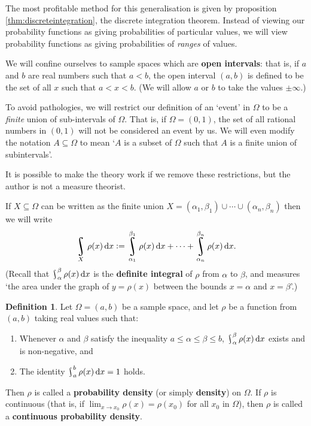\documentclass[a4paper,leqno]{article}
\DeclareMathOperator*{\rint}{\scalerel*{\rotatebox{17}{$\!\int\!$}}{\int}}
\numberwithin{equation}{section}
\theoremstyle{definition}
\newtheorem{defn}[equation]{Definition}
\theoremstyle{remark}
\newcommand{\df}{\textbf}
\newcommand{\union}{\cup}
\begin{document}
The most profitable method for this generalisation is given by proposition \ref{thm:discreteintegration}, the
discrete integration theorem. Instead of viewing our probability functions as giving probabilities of particular
values, we will view probability functions as giving probabilities of \emph{ranges} of values.

We will confine ourselves to sample spaces which are \df{open intervals}: that is, if $ a $ and $ b $ are real numbers
such that $ a < b $, the open interval $ (a,b) $ is defined to be the set of all $ x $ such that $ a < x < b $. (We will
allow $ a $ or $ b $ to take the values $ \pm \infty $.)

To avoid pathologies, we will restrict our definition of an `event' in $ \Omega $ to be a \emph{finite} union of sub-intervals of $ \Omega $.
That is, if $ \Omega = (0,1) $, the set of all rational numbers in $ (0,1) $ will not be considered an event by us. We will even modify the notation
$ A \subseteq \Omega $ to mean `$ A $ is a subset of $ \Omega $ such that $ A $ is a finite union of subintervals'.

It is possible to make the theory work if we remove these restrictions, but the author is not a measure theorist.

If $ X \subseteq \Omega $ can be written as the finite union $ X = (\alpha_1,\beta_1) \union \cdots \union (\alpha_n, \beta_n) $ then
we will write
\begin{displaymath}
  \rint_X \rho(x) \dif{x} := \rint_{\alpha_1}^{\beta_1} \rho(x) \dif{x} + \cdots + \rint_{\alpha_n}^{\beta_n} \rho(x) \dif{x}.
\end{displaymath}
(Recall that $ \rint_\alpha^\beta \rho(x) \dif{x} $ is the \df{definite integral} of $ \rho $ from $ \alpha $ to $ \beta $, and
measures `the area under the graph of $ y = \rho(x) $ between the bounds $ x = \alpha $ and $ x = \beta $'.)

\begin{defn}\label{defn:density}
  Let $ \Omega = (a,b) $ be a sample space, and let $ \rho $ be a function from $ (a,b) $ taking real values such that:
  \begin{enumerate}
    \item Whenever $ \alpha $ and $ \beta $ satisfy the inequality $ a \leq \alpha \leq \beta \leq b $, $ \rint_\alpha^\beta \rho(x) \dif{x} $
          exists and is non-negative, and
    \item The identity $ \rint_a^b \rho(x) \dif{x} = 1 $ holds.
  \end{enumerate}
  Then $ \rho $ is called a \df{probability density} (or simply \df{density}) on $ \Omega $. If $ \rho $ is
  continuous (that is, if $ \lim_{x \to x_0} \rho(x) = \rho(x_0) $ for all $ x_0 $ in $ \Omega $), then $ \rho $
  is called a \df{continuous probability density}.
\end{defn}
\end{document}
